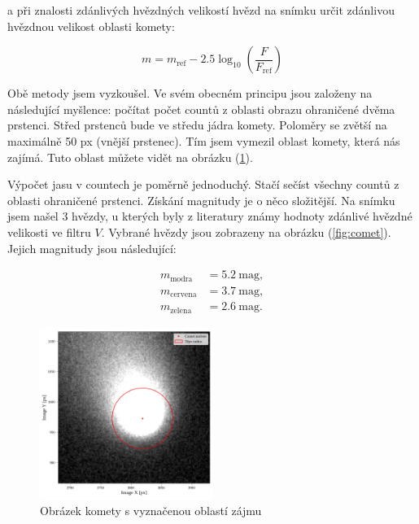 \documentclass[a4paper,11pt,twocolumn]{article}
\begin{document}
        a při znalosti zdánlivých hvězdných velikostí hvězd na snímku určit zdánlivou hvězdnou velikost oblasti komety:

        \begin{equation}
            m = m_{\text{ref}} - 2.5 \log_{10} \left( \frac{F}{F_{\text{ref}}} \right)
        \end{equation}

        Obě metody jsem vyzkoušel.
        Ve svém obecném principu jsou založeny na následující myšlence: počítat počet countů z oblasti obrazu ohraničené dvěma prstenci. Střed prstenců bude ve středu jádra komety. Poloměry se zvětší na maximálně 50 px (vnější prstenec). Tím jsem vymezil oblast komety, která nás zajímá. Tuto oblast můžete vidět na obrázku (\ref{fig:comet_clean}).
        
        Výpočet jasu v countech je poměrně jednoduchý. Stačí sečíst všechny countů z oblasti ohraničené prstenci. Získání magnitudy je o něco složitější. Na snímku jsem našel 3 hvězdy, u kterých byly z literatury známy hodnoty zdánlivé hvězdné velikosti ve filtru $V$. Vybrané hvězdy jsou zobrazeny na obrázku (\ref{fig:comet}). Jejich magnitudy jsou následující:

        \begin{equation*}
            \begin{split}
                m_{\text{modra}} &= 5.2 ~ \text{mag}, \\
                m_{\text{cervena}} &= 3.7 ~ \text{mag}, \\
                m_{\text{zelena}} &= 2.6 ~ \text{mag}.
            \end{split}
        \end{equation*}

        \begin{figure}
            \centering
            \includegraphics[width=0.5\textwidth]{comet_clean}
            \caption{Obrázek komety s vyznačenou oblastí zájmu}
            \label{fig:comet_clean}
        \end{figure}
\end{document}
